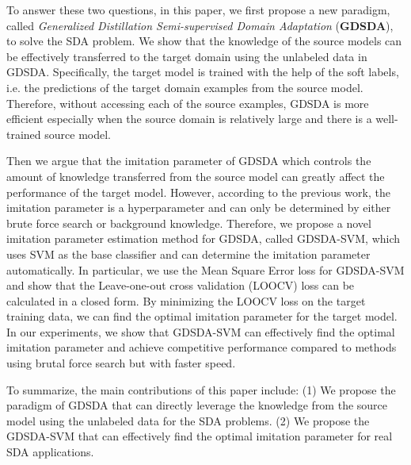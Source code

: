 To answer these two questions, in this paper, we first propose a new paradigm, called \textit{Generalized Distillation Semi-supervised Domain Adaptation} (\textbf{GDSDA}), to solve the SDA problem. 
We show that the knowledge of the source models can be effectively transferred to the target domain using the unlabeled data in GDSDA. Specifically, the target model is trained with the help of the soft labels, i.e. the predictions of the target domain examples from the source model. Therefore, without accessing each of the source examples, GDSDA is more efficient especially when the source domain is relatively large and there is a well-trained source model.

Then we argue that the imitation parameter of GDSDA which controls the amount of knowledge transferred from the source model can greatly affect the performance of the target model.
However, according to the previous work\mbox{\cite{lopez2015unifying,Tzeng_2015_ICCV}}, the imitation parameter is a hyperparameter and can only be determined by either brute force search or background knowledge. 
Therefore, we propose a novel imitation parameter estimation method for GDSDA, called GDSDA-SVM, which uses SVM as the base classifier and can determine the imitation parameter automatically. In particular, we use the Mean Square Error loss for GDSDA-SVM and show that the Leave-one-out cross validation (LOOCV) loss can be calculated in a closed form. By minimizing the LOOCV loss on the target training data, we can find the optimal imitation parameter for the target model. In our experiments, we show that GDSDA-SVM can effectively find the optimal imitation parameter and achieve competitive performance compared to methods using brutal force search but with faster speed. 

To summarize, the main contributions of this paper include: (1) We propose the paradigm of GDSDA that can directly leverage the knowledge from the source model using the unlabeled data for the SDA problems. (2) We propose the GDSDA-SVM that can effectively find the optimal imitation parameter for real SDA applications.

